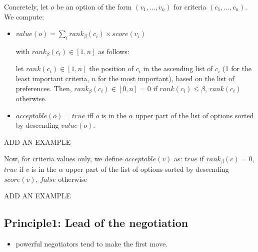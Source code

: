 \documentclass{llncs}
\begin{document}
Concretely, let $o$ be an option of the form $(v_1,\ldots,v_n)$ for criteria $(c_1,\ldots,c_n)$. We compute:
\begin{itemize}
	\item $value(o) = \sum_i rank_\beta(c_i)\times score(v_i)$
	
	with $rank_\beta(c_i)\in[1,n]$ as follows:
	
	let $rank(c_i)\in[1,n]$ the position of $c_i$ in the ascending list of $c_i$ (1 for the least important criteria, $n$ for the most important), based on the list of preferences. Then, $rank_\beta(c_i)\in[0,n] = 0$ if $rank(c_i)\leq \beta$, $rank(c_i)$ otherwise.
	
	\item $acceptable(o) = true$ iff $o$ is in the $\alpha$ upper part of the list of options sorted by descending $value(o)$.
\end{itemize}

ADD AN EXAMPLE

Now, for criteria values only, we define $acceptable(v)$ as: $true$ if $rank_\beta(c)=0$, $true$ if $v$ is in the $\alpha$ upper part of the list of options sorted by descending $score(v)$, $false$ otherwise


ADD AN EXAMPLE

\subsection{Principle1: Lead of the negotiation}
\begin{itemize}
	\item powerful negotiators tend to make the first move.
\end{itemize}  	
	\vskip 4pt
	
	
	
\end{document}
